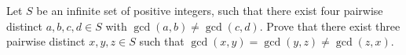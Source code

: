 Let $S$ be an infinite set of positive integers, such that there exist four pairwise distinct $a, b, c, d \in S$ with $\gcd(a, b) \neq \gcd(c, d)$. Prove that there exist three pairwise distinct $x, y, z \in S$ such that $\gcd(x, y) = \gcd(y, z) \neq \gcd(z, x)$.
